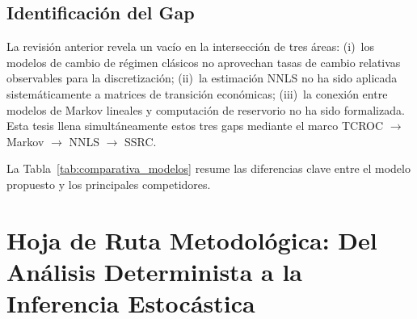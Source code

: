 \subsection{Identificación del Gap}

La revisión anterior revela un vacío en la intersección de tres
áreas: (i)~los modelos de cambio de régimen clásicos no aprovechan
tasas de cambio relativas observables para la discretización;
(ii)~la estimación NNLS no ha sido aplicada sistemáticamente a
matrices de transición económicas; (iii)~la conexión entre modelos
de Markov lineales y computación de reservorio no ha sido
formalizada.  Esta tesis llena simultáneamente estos tres gaps
mediante el marco TCROC $\to$ Markov $\to$ NNLS $\to$ SSRC.

La Tabla~\ref{tab:comparativa_modelos} resume las diferencias
clave entre el modelo propuesto y los principales competidores.

\begin{table}[htbp]
\centering
\caption{Comparación de modelos de cambio de régimen.}
\label{tab:comparativa_modelos}
\end{table}
\section[Hoja de Ruta Metodológica]{Hoja de Ruta Metodológica:
Del Análisis Determinista a la Inferencia Estocástica}
\label{sec:hoja_ruta}


